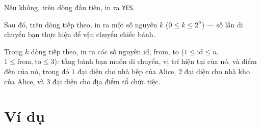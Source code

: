 \documentclass[11pt]{article}
\begin{document}
Nếu không, trên dòng đầu tiên, in ra \texttt{YES}.

Sau đó, trên dòng tiếp theo, in ra một số nguyên $k$ ($0 \le k \le 2^n$) — số lần di chuyển bạn thực hiện để vận chuyển chiếc bánh.

Trong $k$ dòng tiếp theo, in ra các số nguyên $\mathrm{id}$, $\mathrm{from}$, $\mathrm{to}$ ($1 \le \mathrm{id} \le n$, $1 \le \mathrm{from}, \mathrm{to} \le 3$): tầng bánh bạn muốn di chuyển, vị trí hiện tại của nó, và điểm đến của nó, trong đó $1$ đại diện cho nhà bếp của Alice, $2$ đại diện cho nhà kho của Alice, và $3$ đại diện cho địa điểm tổ chức tiệc.

\section*{Ví dụ}
\begin{example}
%
\end{example}
\end{document}
